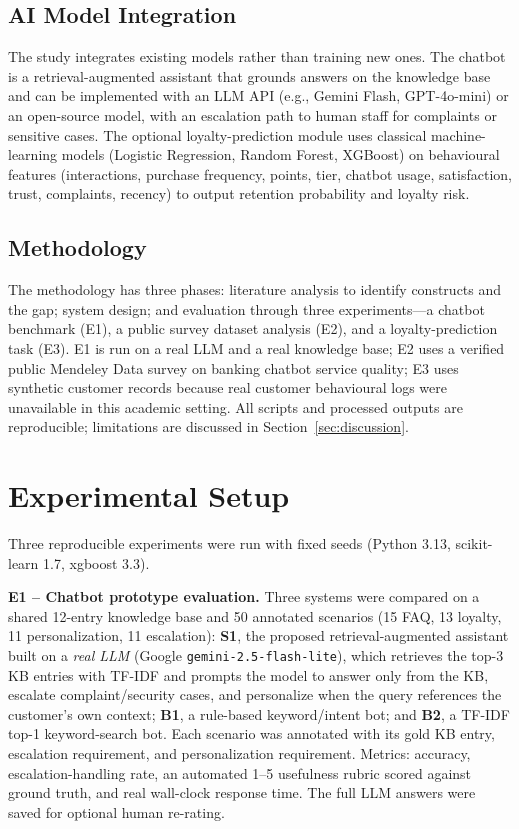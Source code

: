 \documentclass[runningheads]{llncs}
\begin{document}
\subsection{AI Model Integration}
The study integrates existing models rather than training new ones. The chatbot is a retrieval-augmented assistant that grounds answers on the knowledge base and can be implemented with an LLM API (e.g., Gemini Flash, GPT-4o-mini) or an open-source model, with an escalation path to human staff for complaints or sensitive cases. The optional loyalty-prediction module uses classical machine-learning models (Logistic Regression, Random Forest, XGBoost) on behavioural features (interactions, purchase frequency, points, tier, chatbot usage, satisfaction, trust, complaints, recency) to output retention probability and loyalty risk.

\subsection{Methodology}
The methodology has three phases: literature analysis to identify constructs and the gap; system design; and evaluation through three experiments---a chatbot benchmark (E1), a public survey dataset analysis (E2), and a loyalty-prediction task (E3). E1 is run on a real LLM and a real knowledge base; E2 uses a verified public Mendeley Data survey on banking chatbot service quality; E3 uses synthetic customer records because real customer behavioural logs were unavailable in this academic setting. All scripts and processed outputs are reproducible; limitations are discussed in Section~\ref{sec:discussion}.

\section{Experimental Setup}

Three reproducible experiments were run with fixed seeds (Python 3.13, scikit-learn 1.7, xgboost 3.3).

\noindent\textbf{E1 -- Chatbot prototype evaluation.} Three systems were compared on a shared 12-entry knowledge base and 50 annotated scenarios (15 FAQ, 13 loyalty, 11 personalization, 11 escalation): \textbf{S1}, the proposed retrieval-augmented assistant built on a \emph{real LLM} (Google \texttt{gemini-2.5-flash-lite}), which retrieves the top-3 KB entries with TF-IDF and prompts the model to answer only from the KB, escalate complaint/security cases, and personalize when the query references the customer's own context; \textbf{B1}, a rule-based keyword/intent bot; and \textbf{B2}, a TF-IDF top-1 keyword-search bot. Each scenario was annotated with its gold KB entry, escalation requirement, and personalization requirement. Metrics: accuracy, escalation-handling rate, an automated 1--5 usefulness rubric scored against ground truth, and real wall-clock response time. The full LLM answers were saved for optional human re-rating.
\end{document}
